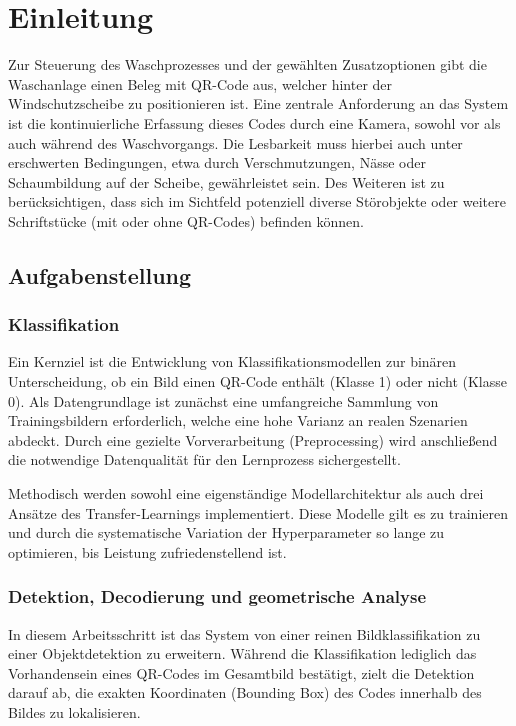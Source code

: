 \documentclass[
    a4paper,        %
    11pt,           %
    ngerman,        %
    parskip=half,   %
    listof=totoc,   %
    bibliography=totoc %
]{scrartcl}
\begin{document}

\section{Einleitung}

Zur Steuerung des Waschprozesses und der gewählten Zusatzoptionen gibt die Waschanlage einen Beleg mit QR-Code aus, welcher hinter der Windschutzscheibe zu positionieren ist. Eine zentrale Anforderung an das System ist die kontinuierliche Erfassung dieses Codes durch eine Kamera, sowohl vor als auch während des Waschvorgangs. Die Lesbarkeit muss hierbei auch unter erschwerten Bedingungen, etwa durch Verschmutzungen, Nässe oder Schaumbildung auf der Scheibe, gewährleistet sein. Des Weiteren ist zu berücksichtigen, dass sich im Sichtfeld potenziell diverse Störobjekte oder weitere Schriftstücke (mit oder ohne QR-Codes) befinden können.
%
\subsection{Aufgabenstellung}

\subsubsection{Klassifikation}

Ein Kernziel ist die Entwicklung von Klassifikationsmodellen zur binären Unterscheidung, ob ein Bild einen QR-Code enthält (Klasse 1) oder nicht (Klasse 0). Als Datengrundlage ist zunächst eine umfangreiche Sammlung von Trainingsbildern erforderlich, welche eine hohe Varianz an realen Szenarien abdeckt. Durch eine gezielte Vorverarbeitung (Preprocessing) wird anschließend die notwendige Datenqualität für den Lernprozess sichergestellt.

Methodisch werden sowohl eine eigenständige Modellarchitektur als auch drei Ansätze des Transfer-Learnings implementiert. Diese Modelle gilt es zu trainieren und durch die systematische Variation der Hyperparameter so lange zu optimieren, bis Leistung zufriedenstellend ist.

\subsubsection{Detektion, Decodierung und geometrische Analyse}

In diesem Arbeitsschritt ist das System von einer reinen Bildklassifikation zu einer Objektdetektion zu erweitern. Während die Klassifikation lediglich das Vorhandensein eines QR-Codes im Gesamtbild bestätigt, zielt die Detektion darauf ab, die exakten Koordinaten (Bounding Box) des Codes innerhalb des Bildes zu lokalisieren.
\end{document}
